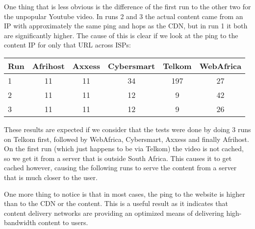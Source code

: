 \documentclass{sig-alternate-05-2015}
\begin{document}
One thing that is less obvious is the difference of the first run to the other two for the unpopular Youtube video. In runs 2 and 3 the actual content came from an IP with approximately the same ping and hops as the CDN, but in run 1 it both are significantly higher. The cause of this is clear if we look at the ping to the content IP for only that URL across ISPs:
\vspace{1em} \\
\begin{tabular}{|l|c|c|c|c|c|} \hline
Run & Afrihost & Axxess & Cybersmart & Telkom & WebAfrica \\ \hline
1 & 11 & 11  & 34  & 197 & 27 \\ \hline
2 & 11 & 11  & 12  & 9   & 42 \\ \hline
3 & 11 & 11  & 12  & 9   & 26 \\ \hline
\end{tabular}
These results are expected if we consider that the tests were done by doing 3 runs on Telkom first, followed by WebAfrica, Cybersmart, Axxess and finally Afrihost. On the first run (which just happens to be via Telkom) the video is not cached, so we get it from a server that is outside South Africa. This causes it to get cached however, causing the following runs to serve the content from a server that is much closer to the user.

One more thing to notice is that in most cases, the ping to the website is higher than to the CDN or the content. This is a useful result as it indicates that content delivery networks are providing an optimized means of delivering high-bandwidth content to users.
\end{document}
